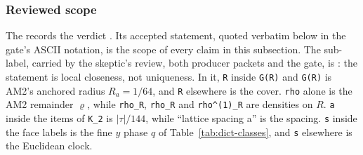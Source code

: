 \subsubsection{Reviewed scope}
\label{sec:ay1-scope}
The  records the
verdict . Its accepted statement, quoted verbatim
below in the gate's ASCII notation, is the scope of every claim in this
subsection. The sub-label, carried by the skeptic's review, both producer
packets and the gate, is : the
statement is local closeness, not uniqueness. In it, \texttt{R} inside \texttt{G(R)} and
\texttt{G\textquotesingle{}(R)} is AM2's anchored radius $R_a=1/64$, and
\texttt{R} elsewhere is the cover. \texttt{rho} alone is the AM2 remainder
$\varrho$, while \texttt{rho\_R}, \texttt{rho\textquotesingle{}\_R} and
\texttt{rho\textasciicircum{}(1)\_R} are densities on $R$. \texttt{a} inside
the items of \texttt{K\_2\textquotesingle{}} is $|\tau|/144$, while ``lattice
spacing a'' is the spacing. \texttt{s} inside the face labels is the fine $y$
phase $q$ of Table~\ref{tab:dict-classes}, and \texttt{s} elsewhere is the
Euclidean clock.

